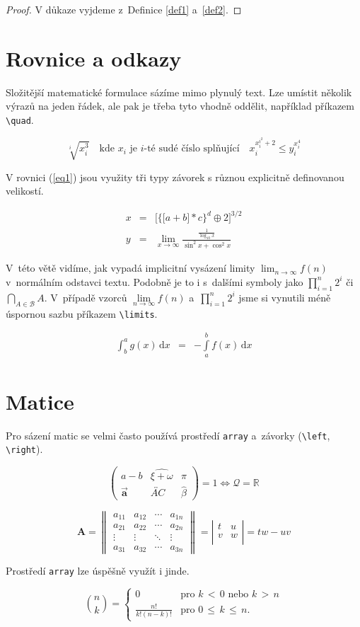 \documentclass[twocolumn, 11pt]{article}
\begin{document}
\begin{proof}
    V důkaze vyjdeme z~Definice \ref{def1} a~\ref{def2}.
\end{proof}


\section{Rovnice a odkazy}
Složitější matematické formulace sázíme mimo plynulý
text. Lze umístit několik výrazů na jeden řádek, ale pak je třeba tyto vhodně oddělit, například příkazem \verb|\quad|.

$$
\sqrt[i]{x_i^3}\quad \text{kde } x_i \text{ je } i\text{-té sudé číslo splňující}\quad x_i^{x_i^{i^2}+2} \leq  y_i^{x_i^4}
$$ \par
V rovnici (\ref{eq1}) jsou využity tři typy závorek s různou
explicitně definovanou velikostí.

\begin{eqnarray}
\label{eq1}
x & = & \bigg[  \Big\{ \big[ a+b \big] \ast c \Big\}^d \oplus 2 \bigg]^{3/2} \\
y & = & \lim_{x\to\infty} \frac{\frac{1}{\log_{10} x}}{\sin^2 x + \cos^2 x}\nonumber
\end{eqnarray}

V~této větě vidíme, jak vypadá implicitní vysázení limity $\lim_{n\to\infty} f(n)$ v~normálním odstavci textu. Podobně
je to i s~dalšími symboly jako $\prod_{i=1}^{n} 2^i$ či $\bigcap_{A\in \mathcal{B}} A$.
V~případě vzorců $\lim\limits_{n\to\infty} f(n)$ a~$\prod\limits_{i=1}^n 2^i$ jsme si vynutili méně úspornou sazbu příkazem \verb|\limits|.

\begin{eqnarray}
\int_{b}^{a} g(x)\,\mathrm{d}x & = & -\int\limits_{a}^{b} f(x)\,\mathrm{d}x
\end{eqnarray}

\section{Matice}
Pro sázení matic se velmi často používá prostředí \verb|array| a~závorky (\verb|\left|, \verb|\right|).

$$
 \left( \begin{array}{ccc}
a-b & \widehat{\xi + \omega} & \pi \\
\vec{\mathbf{a}} & \overleftrightarrow{AC} & \hat{\beta} \end{array} \right) = 1 \Longleftrightarrow \mathcal{Q} = \mathbb{R}
$$

$$
\mathbf{A} = \left\|\begin{array}{cccc}
a_{11} & a_{12} & \cdots & a_{1n} \\
a_{21} & a_{22} & \cdots & a_{2n} \\
\vdots & \vdots & \ddots & \vdots \\
a_{31} & a_{32} & \cdots & a_{3n} \end{array} \right\| = \left| \begin{array}{cc} t & u \\ v & w \\ \end{array} \right|= tw-uv
$$ 

Prostředí \verb|array| lze úspěšně využít i jinde.

 $$\binom{n}{k} = \left\{ \begin{array}{cl}
         0 & \mbox{pro }k\,<\,0 \mbox{ nebo }k\,>\,n\\
        \frac{n!}{k!(n-k)!} & \mbox{pro }  0\, \leq \,k\, \leq\, n.\end{array} \right.$$
\end{document}
